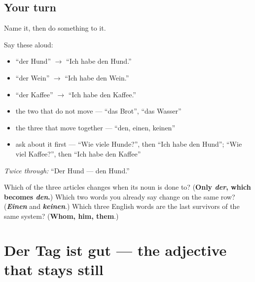 \subsection*{Your turn}
Name it, then do something to it.

Say these aloud:

\begin{itemize}
\raggedright
  \item \textquotedblleft{}der Hund\textquotedblright{} $\to$ \textquotedblleft{}Ich habe den Hund.\textquotedblright{}
  \item \textquotedblleft{}der Wein\textquotedblright{} $\to$ \textquotedblleft{}Ich habe den Wein.\textquotedblright{}
  \item \textquotedblleft{}der Kaffee\textquotedblright{} $\to$ \textquotedblleft{}Ich habe den Kaffee.\textquotedblright{}
  \item the two that do not move — \textquotedblleft{}das Brot\textquotedblright{}, \textquotedblleft{}das Wasser\textquotedblright{}
  \item the three that move together — \textquotedblleft{}den, einen, keinen\textquotedblright{}
  \item ask about it first — \textquotedblleft{}Wie viele Hunde?\textquotedblright{}, then \textquotedblleft{}Ich habe den Hund\textquotedblright{}; \textquotedblleft{}Wie viel Kaffee?\textquotedblright{}, then \textquotedblleft{}Ich habe den Kaffee\textquotedblright{}
\end{itemize}

\emph{Twice through:} \textquotedblleft{}Der Hund — den Hund.\textquotedblright{}

\begin{tcolorbox}[breakable,colback=teal!4,colframe=teal!35!black,title={Before you move on}]
Which of the three articles changes when its noun is done to? (\textbf{Only \emph{der}, which becomes \emph{den}.}) Which two words you already say change on the same row? (\emph{\textbf{Einen}} and \emph{\textbf{keinen}}.) Which three English words are the last survivors of the same system? (\textbf{Whom, him, them}.)
\end{tcolorbox}
\section[Der Tag ist gut]{Der Tag ist gut — the adjective that stays still}

\label{lesson:GE-C34-praedikativ}



